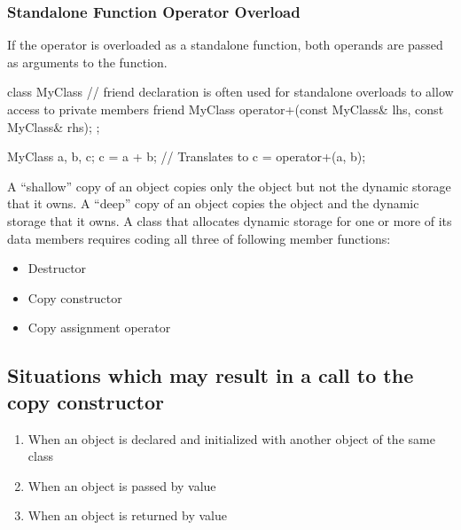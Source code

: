\documentclass{report}
\begin{document}
     \bigbreak \noindent 
     \subsubsection{Standalone Function Operator Overload}
     \bigbreak \noindent 
     If the operator is overloaded as a standalone function, both operands are passed as arguments to the function.
     \bigbreak \noindent 
     \begin{cppcode}
         class MyClass {
             // friend declaration is often used for standalone overloads to allow access to private members
             friend MyClass operator+(const MyClass& lhs, const MyClass& rhs);
         };

         MyClass a, b, c;
         c = a + b; // Translates to c = operator+(a, b);
     \end{cppcode}

     \pagebreak 
     \bigbreak \noindent 
     A “shallow” copy of an object copies only the object but not the dynamic storage that it owns. A “deep” copy of an object copies the object and the dynamic storage that it owns.
\bigbreak \noindent 
     A class that allocates dynamic storage for one or more of its data members requires coding all three of following member functions:
     \begin{itemize}
         \item Destructor
         \item Copy constructor
         \item Copy assignment operator
     \end{itemize}

     \pagebreak 
     \bigbreak \noindent 
     \subsection{Situations which may result in a call to the copy constructor}
     \begin{enumerate}
         \item When an object is declared and initialized with another object of the same class
         \item When an object is passed by value
         \item When an object is returned by value
     \end{enumerate}

     \pagebreak 
\end{document}
